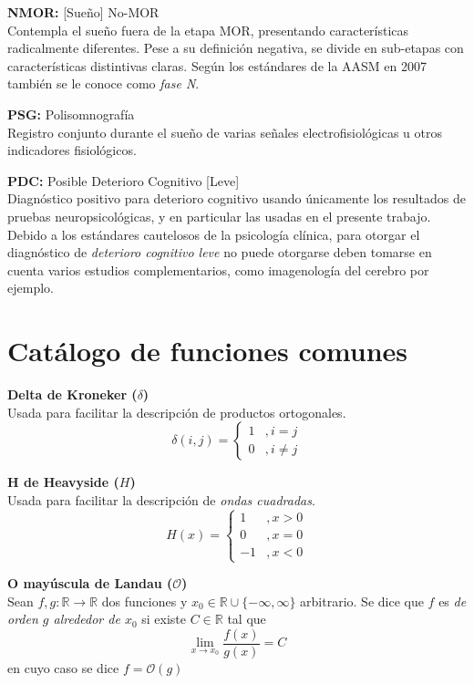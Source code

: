 \documentclass[12pt,letterpaper]{book}
\newcommand{\R}{\mathbb{R}}
\newcommand{\orden}[1]{\mathcal{O}\left( #1 \right)}
\begin{document}
{\textbf{NMOR:} [Sueño] No-MOR \\
Contempla el sueño fuera de la etapa MOR, presentando características radicalmente diferentes.
Pese a su definición negativa, se divide en sub-etapas con características distintivas claras.
Según los estándares de la AASM en 2007 también se le conoce como \textit{fase N}.

\textbf{PSG:}  Polisomnografía \\
Registro conjunto durante el sueño de varias señales electrofisiológicas u otros indicadores fisiológicos.

\textbf{PDC:}  Posible Deterioro Cognitivo [Leve] \\
Diagnóstico positivo para deterioro cognitivo usando únicamente los resultados de pruebas neuropsicológicas, y en particular las usadas en el presente trabajo.
Debido a los estándares cautelosos de la psicología clínica, para otorgar el diagnóstico de \textit{deterioro cognitivo leve} no puede otorgarse deben tomarse en cuenta varios estudios complementarios, como imagenología del cerebro por ejemplo.

}

\section*{Catálogo de funciones comunes}
{
\setlength{\leftskip}{2em}
\setlength{\parindent}{-2em}

\textbf{Delta de Kroneker ($\delta$)} \\
Usada para facilitar la descripción de productos ortogonales.
\begin{equation*}
\delta(i,j) = \begin{cases}
1 &, i = j \\
0 &, i \neq j
\end{cases}
\end{equation*}

\textbf{H de Heavyside ($H$)} \\
Usada para facilitar la descripción de \textit{ondas cuadradas}.
\begin{equation*}
H(x) = \begin{cases}
1 &, x>0 \\
0 &, x=0 \\
-1 &, x<0
\end{cases}
\end{equation*}

\textbf{O mayúscula de Landau ($\mathcal{O}$)} \\
Sean $f, g : \R \rightarrow \R$ dos funciones y $x_0 \in \R \cup \{ -\infty, \infty\}$ arbitrario. Se dice que $f$ es \textit{de orden $g$ alrededor de $x_0$} si existe $C \in \R$ tal que
\begin{equation*}
\lim_{x \rightarrow x_0} \frac{f(x)}{g(x)} = C
\end{equation*} 
en cuyo caso se dice $f = \orden{g}$
}
\end{document}
